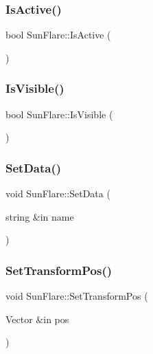 \hypertarget{class_sun_flare_a8ae934875f67a1447aeb5619ef813327}{}\label{class_sun_flare_a8ae934875f67a1447aeb5619ef813327} 
\subsubsection{\texorpdfstring{Is\+Active()}{IsActive()}}
{\footnotesize\ttfamily bool Sun\+Flare\+::\+Is\+Active (\begin{DoxyParamCaption}{ }\end{DoxyParamCaption})}

\hypertarget{class_sun_flare_a6ee7ba00a655db20810004f2e3a0e6c5}{}\label{class_sun_flare_a6ee7ba00a655db20810004f2e3a0e6c5} 
\subsubsection{\texorpdfstring{Is\+Visible()}{IsVisible()}}
{\footnotesize\ttfamily bool Sun\+Flare\+::\+Is\+Visible (\begin{DoxyParamCaption}{ }\end{DoxyParamCaption})}

\hypertarget{class_sun_flare_a0f0ea3a4b145899c028577b7155b8cba}{}\label{class_sun_flare_a0f0ea3a4b145899c028577b7155b8cba} 
\subsubsection{\texorpdfstring{Set\+Data()}{SetData()}}
{\footnotesize\ttfamily void Sun\+Flare\+::\+Set\+Data (\begin{DoxyParamCaption}\item[{string \&in}]{name }\end{DoxyParamCaption})}

\hypertarget{class_sun_flare_a393f28d63511068f8033a5261f27c61d}{}\label{class_sun_flare_a393f28d63511068f8033a5261f27c61d} 
\subsubsection{\texorpdfstring{Set\+Transform\+Pos()}{SetTransformPos()}}
{\footnotesize\ttfamily void Sun\+Flare\+::\+Set\+Transform\+Pos (\begin{DoxyParamCaption}\item[{Vector \&in}]{pos }\end{DoxyParamCaption})}

